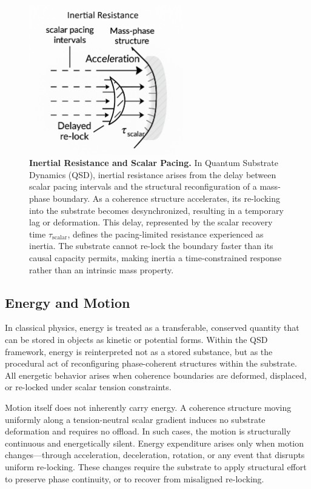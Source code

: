 \documentclass[entropy,article,submit,pdftex,moreauthors]{Definitions/mdpi}
\begin{document}
\begin{figure}[H]
    \centering
    \includegraphics[width=0.6\textwidth]{figures/inertia.png}
    \caption{
    \textbf{Inertial Resistance and Scalar Pacing.}
    In Quantum Substrate Dynamics (QSD), inertial resistance arises from the delay between scalar pacing intervals and the structural reconfiguration of a mass-phase boundary. As a coherence structure accelerates, its re-locking into the substrate becomes desynchronized, resulting in a temporary lag or deformation. This delay, represented by the scalar recovery time \( \tau_{\text{scalar}} \), defines the pacing-limited resistance experienced as inertia. The substrate cannot re-lock the boundary faster than its causal capacity permits, making inertia a time-constrained response rather than an intrinsic mass property.
    }
    \label{fig:inertial-resistance}
\end{figure}

\subsection{Energy and Motion}

In classical physics, energy is treated as a transferable, conserved quantity that can be stored in objects as kinetic or potential forms. Within the QSD framework, energy is reinterpreted not as a stored substance, but as the procedural act of reconfiguring phase-coherent structures within the substrate. All energetic behavior arises when coherence boundaries are deformed, displaced, or re-locked under scalar tension constraints.

Motion itself does not inherently carry energy. A coherence structure moving uniformly along a tension-neutral scalar gradient induces no substrate deformation and requires no offload. In such cases, the motion is structurally continuous and energetically silent. Energy expenditure arises only when motion changes—through acceleration, deceleration, rotation, or any event that disrupts uniform re-locking. These changes require the substrate to apply structural effort to preserve phase continuity, or to recover from misaligned re-locking.
\end{document}
